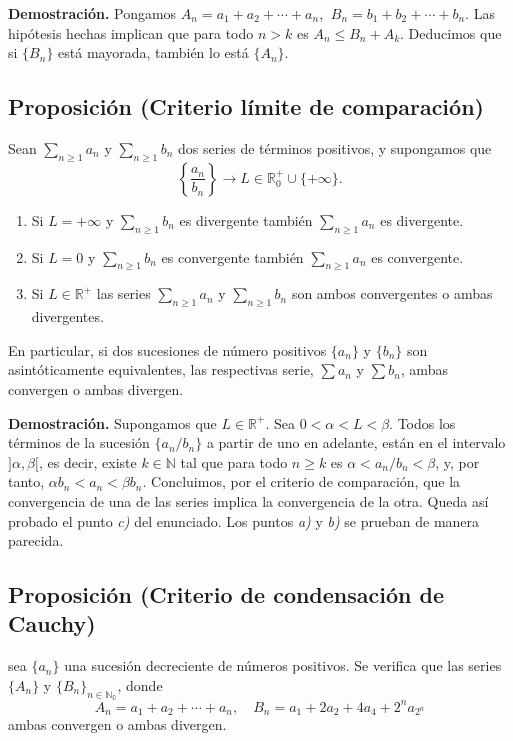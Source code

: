 \documentclass[10pt,a4paper]{article}
\begin{document}
	\textbf{Demostración. }Pongamos $A_n = a_1 + a_2 + \cdots + a_n$, $ ~B_n = b_1 + b_2 + \cdots + b_n$. Las hipótesis hechas implican que para todo $n > k$ es $A_n \leq B_n + A_k$. Deducimos que si $\{B_n\}$ está mayorada, también lo está $\{A_n\}$.
	
	\subsection{Proposición (Criterio límite de comparación)}
	
	Sean $\displaystyle\sum_{n \geq 1}a_n$ y $\displaystyle\sum_{n \geq 1}b_n$ dos series de términos positivos, y supongamos que $$\left\{\dfrac{a_n}{b_n}\right\} \rightarrow L \in \mathbb{R}_0 ^+ \cup \{+ \infty\}.$$
	
	\begin{enumerate}[label = \alph*)]
		\item Si $L = + \infty$ y $\displaystyle\sum_{n \geq 1}b_n$ es divergente también $\displaystyle\sum_{n \geq 1}a_n$ es divergente.
		\item Si $L = 0$ y $\displaystyle\sum_{n \geq 1}b_n$ es convergente también $\displaystyle\sum_{n \geq 1}a_n$ es convergente.
		\item Si $L \in \mathbb{R}^+$ las series $\displaystyle\sum_{n \geq 1}a_n$ y $\displaystyle\sum_{n \geq 1}b_n$ son ambos convergentes o ambas divergentes.
	\end{enumerate}

	En particular, si dos sucesiones de número positivos $\{a_n\}$ y $\{b_n\}$ son asintóticamente equivalentes, las respectivas serie, $\sum a_n$ y $\sum b_n$, ambas convergen o ambas divergen.
	
	\textbf{Demostración. }Supongamos que $L \in \mathbb{R}^+$. Sea $0 < \alpha < L < \beta$. Todos los términos de la sucesión $\{a_n / b_n\}$ a partir de uno en adelante, están en el intervalo $]\alpha, \beta[$, es decir, existe $k \in \mathbb{N}$ tal que para todo $n \geq k$ es $\alpha < a_n / b_n < \beta$, y, por tanto, $\alpha b_n < a_n < \beta b_n$. Concluimos, por el criterio de comparación, que la convergencia de una de las series implica la convergencia de la otra. Queda así probado el punto \textit{c)} del enunciado. Los puntos \textit{a)} y \textit{b)} se prueban de manera parecida.
	
	\subsection{Proposición (Criterio de condensación de Cauchy)}
	sea $\{a_n\}$ una sucesión decreciente de números positivos. Se verifica que las series $\{A_n\}$ y $\{B_n\}_{n \in \mathbb{N_0}}$, donde 
	$$A_n = a_1 + a_2 + \cdots + a_n, \quad B_n = a_1 + 2a_2 + 4a_4 + 2^n a_{2^n}$$
	ambas convergen o ambas divergen.
	
\end{document}
